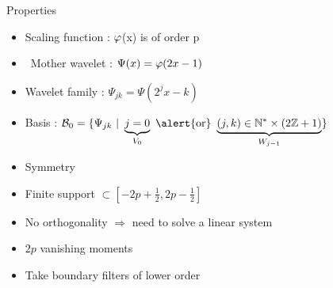 \begin{frame}{Properties} 

    \begin{itemize}
        \item  Scaling function : $\P$(x) is of order p
        \item  Mother wavelet : $\Psi(x) = \P(2x - 1)$
        \item  Wavelet family : $\Psi_{jk} = \Psi(2^j x - k)$
        \item  Basis : $\mathcal{B}_0 = \{ \Psi_{jk}\ |\ \underbrace{j = 0}_{V_0} \textrm{ \alert{or} } \underbrace{(j,k) \in \N^* \times (2\Z + 1)}_{W_{j-1}} \}$
    \end{itemize}

    
    \begin{itemize}
        \item Symmetry
        \item Finite support $\subset [-2p+\frac{1}{2}, 2p-\frac{1}{2} ]$
        \item \alert{No orthogonality} $\Rightarrow$ need to solve a linear system
        \item $2p$ vanishing moments
    \end{itemize}
    
    \begin{itemize}
        \item Take \alert{boundary filters of lower order}
    \end{itemize}
    
\end{frame}

